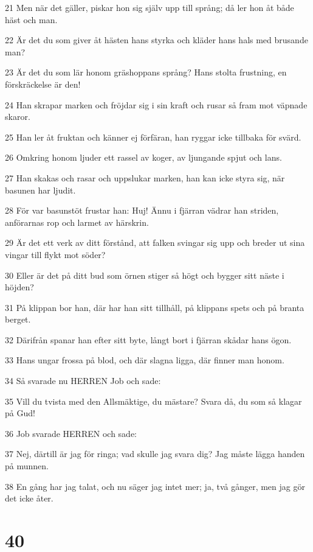 \par 21 Men när det gäller, piskar hon sig själv upp till språng; då ler hon åt både häst och man.
\par 22 Är det du som giver åt hästen hans styrka och kläder hans hals med brusande man?
\par 23 Är det du som lär honom gräshoppans språng? Hans stolta frustning, en förskräckelse är den!
\par 24 Han skrapar marken och fröjdar sig i sin kraft och rusar så fram mot väpnade skaror.
\par 25 Han ler åt fruktan och känner ej förfäran, han ryggar icke tillbaka för svärd.
\par 26 Omkring honom ljuder ett rassel av koger, av ljungande spjut och lans.
\par 27 Han skakas och rasar och uppslukar marken, han kan icke styra sig, när basunen har ljudit.
\par 28 För var basunstöt frustar han: Huj! Ännu i fjärran vädrar han striden, anförarnas rop och larmet av härskrin.
\par 29 Är det ett verk av ditt förstånd, att falken svingar sig upp och breder ut sina vingar till flykt mot söder?
\par 30 Eller är det på ditt bud som örnen stiger så högt och bygger sitt näste i höjden?
\par 31 På klippan bor han, där har han sitt tillhåll, på klippans spets och på branta berget.
\par 32 Därifrån spanar han efter sitt byte, långt bort i fjärran skådar hans ögon.
\par 33 Hans ungar frossa på blod, och där slagna ligga, där finner man honom.
\par 34 Så svarade nu HERREN Job och sade:
\par 35 Vill du tvista med den Allsmäktige, du mästare? Svara då, du som så klagar på Gud!
\par 36 Job svarade HERREN och sade:
\par 37 Nej, därtill är jag för ringa; vad skulle jag svara dig? Jag måste lägga handen på munnen.
\par 38 En gång har jag talat, och nu säger jag intet mer; ja, två gånger, men jag gör det icke åter.

\chapter{40}

